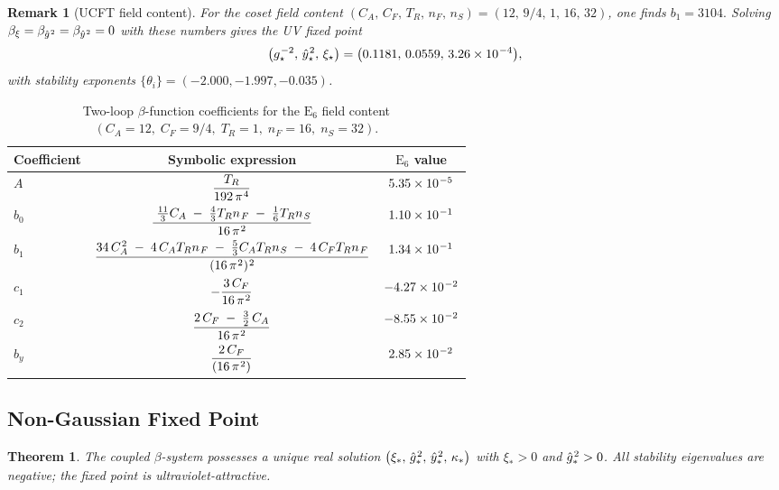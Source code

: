 \documentclass[pdflatex,sn-mathphys-num]{sn-jnl}
\theoremstyle{thmstyleone}
\newtheorem{theorem}{Theorem}
\theoremstyle{thmstyletwo}%
\newtheorem{remark}{Remark}%
\theoremstyle{thmstylethree}%
\newcommand{\sm}{\hspace{.065em}}
\newcommand{\smexp}[1]{^{\sm #1}}
\renewcommand{\arraystretch}{1.25}
\begin{document}
\begin{remark}[UCFT field content]
For the coset field content \(
  (C_A,\, C_F,\, T_R,\, n_F,\, n_S)=(12,\, 9/4,\, 1,\, 16,\,32)
\),
one finds
\(
  b_{1}=3104.
\)
Solving \(\beta_{\xi}=\beta_{\hat g\smexp{2}}=\beta_{\hat y\smexp{2}}=0\) with these
numbers gives the UV fixed point
\[
  \bigl(g\smexp{-2}_{\star},\, \hat y\smexp{2}_{\star},\, \xi_{\star}\bigr)
  =\bigl(0.1181,\,0.0559,\,3.26\times10\smexp{-4}\bigr),
\]
with stability exponents
\(\{\theta_{i}\}=(-2.000,-1.997,-0.035)\).
\end{remark}

\begin{table}[h]
\renewcommand{\arraystretch}{1.5}
\centering
\caption{Two-loop $\beta$-function coefficients for the $\mathrm E_{6}$ field content $(C_{A}=12,\;C_{F}=9/4,\;T_{R}=1,\;n_{F}=16,\;n_{S}=32)$.}
\label{tab:TwoLoopCoeffs}
\renewcommand{\arraystretch}{1.35}
\begin{tabular}{lcc}
\hline
Coefficient & Symbolic expression & $\mathrm E_{6}$ value \\ \hline
$\displaystyle A$   &
\rule{0pt}{1.8em} $\dfrac{T_{R}}{192\,\pi\smexp{4}}$ &
$5.35\times10\smexp{-5}$ \\[9pt]

$\displaystyle b_{0}$ &
$\dfrac{\;\tfrac{11}{3}C_{A}\;-\;\tfrac{4}{3}T_{R}n_{\sm F}\;-\;\tfrac16 T_{R}n_{\sm S}}{16\,\pi\smexp{2}}$ &
$1.10\times10\smexp{-1}$ \\[9pt]

$\displaystyle b_{1}$ &
$\dfrac{34\,C_{A}\smexp{2}\;-\;4\,C_{A}T_{R}n_{\sm F}\;-\;\tfrac53 C_{A}T_{R}n_{\sm S}\;-\;4\,C_{F}T_{R}n_{\sm F}}
       {(16\,\pi\smexp{2})\smexp{2}}$ &
$1.34\times10\smexp{-1}$ \\[9pt]

$\displaystyle c_{1}$ &
$-\dfrac{3\,C_{F}}{16\,\pi\smexp{2}}$ &
$-4.27\times10\smexp{-2}$ \\[9pt]

$\displaystyle c_{2}$ &
$\dfrac{2\,C_{F}\;-\;\tfrac32\,C_{A}}{16\,\pi\smexp{2}}$ &
$-8.55\times10\smexp{-2}$ \\[9pt]

$\displaystyle b_{y}$ &
$\dfrac{2\,C_{F}}{(16\,\pi\smexp{2})}$ &
$2.85\times10\smexp{-2}$ \\[9pt] \hline
\end{tabular}
\end{table}


\subsection{Non-Gaussian Fixed Point}
\label{subsec:FixedPoint}
\begin{theorem}\label{thm:FixedPoint}
The coupled $\beta$-system possesses a unique real solution
\(
  \bigl(\xi_{\ast},\,
   \hat g\smexp{2}_{\ast},\,
   \hat y\smexp{2}_{\ast},\,
   \kappa_{\ast}\bigr)
\)
with $\xi_{\ast}>0$ and $\hat g\smexp{2}_{\ast}>0$. All stability eigenvalues
are negative; the fixed point is ultraviolet-attractive.
\end{theorem}
\end{document}
